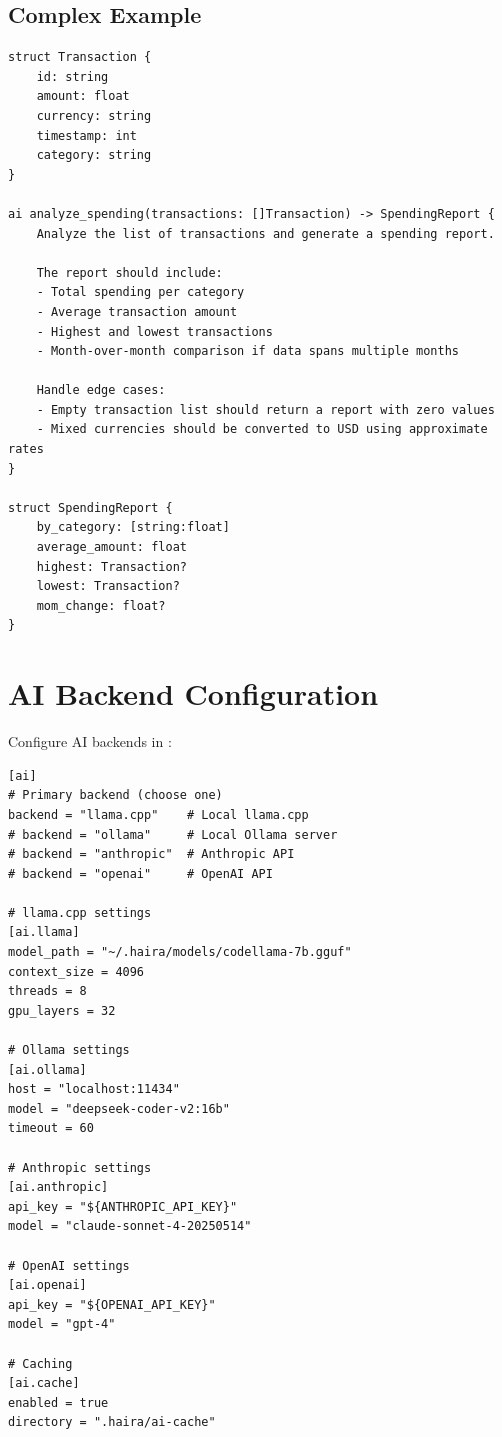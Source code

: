 \subsection{Complex Example}

\begin{lstlisting}
struct Transaction {
    id: string
    amount: float
    currency: string
    timestamp: int
    category: string
}

ai analyze_spending(transactions: []Transaction) -> SpendingReport {
    Analyze the list of transactions and generate a spending report.

    The report should include:
    - Total spending per category
    - Average transaction amount
    - Highest and lowest transactions
    - Month-over-month comparison if data spans multiple months

    Handle edge cases:
    - Empty transaction list should return a report with zero values
    - Mixed currencies should be converted to USD using approximate rates
}

struct SpendingReport {
    by_category: [string:float]
    average_amount: float
    highest: Transaction?
    lowest: Transaction?
    mom_change: float?
}
\end{lstlisting}

\section{AI Backend Configuration}

Configure AI backends in :

\begin{lstlisting}[language={}]
[ai]
# Primary backend (choose one)
backend = "llama.cpp"    # Local llama.cpp
# backend = "ollama"     # Local Ollama server
# backend = "anthropic"  # Anthropic API
# backend = "openai"     # OpenAI API

# llama.cpp settings
[ai.llama]
model_path = "~/.haira/models/codellama-7b.gguf"
context_size = 4096
threads = 8
gpu_layers = 32

# Ollama settings
[ai.ollama]
host = "localhost:11434"
model = "deepseek-coder-v2:16b"
timeout = 60

# Anthropic settings
[ai.anthropic]
api_key = "${ANTHROPIC_API_KEY}"
model = "claude-sonnet-4-20250514"

# OpenAI settings
[ai.openai]
api_key = "${OPENAI_API_KEY}"
model = "gpt-4"

# Caching
[ai.cache]
enabled = true
directory = ".haira/ai-cache"
\end{lstlisting}

